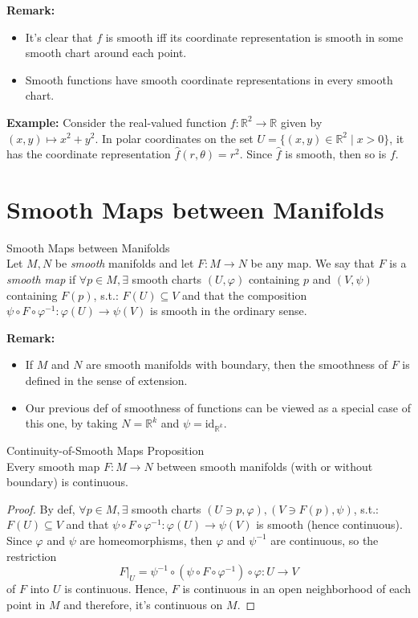 \noindent\textbf{Remark:} \begin{itemize}
    \item It's clear that $f$ is smooth iff its coordinate representation is smooth in some smooth chart around each point.
    \item Smooth functions have smooth coordinate representations in every smooth chart.
\end{itemize}

\noindent\textbf{Example:} Consider the real-valued function $f: \mathbb{R}^2 \to \mathbb{R}$ given by $(x,y) \mapsto x^2+y^2$. In polar coordinates on the set $U= \{(x,y) \in \mathbb{R}^2 \mid x>0 \}$, it has the coordinate representation $\widehat{f} (r,\theta)= r^2$. Since $\widehat{f}$ is smooth, then so is $f$.

\section{Smooth Maps between Manifolds}

\begin{definition}{Smooth Maps between Manifolds}\\
Let $M,N$ be \textit{smooth} manifolds and let $F:M\to N$ be any map. We say that $F$ is a \textit{smooth map} if $\forall p\in M,\exists$ smooth charts $(U,\varphi)$ containing $p$ and $(V,\psi)$ containing $F(p)$, s.t.: $F(U) \subseteq V$ and that the composition $\psi \circ F\circ \varphi^{-1}: \varphi(U) \to \psi(V)$ is smooth in the ordinary sense.
\end{definition}

\noindent\textbf{Remark:} \begin{itemize}
    \item If $M$ and $N$ are smooth manifolds with boundary, then the smoothness of $F$ is defined in the sense of extension.
    \item Our previous def of smoothness of functions can be viewed as a special case of this one, by taking $N= \mathbb{R}^k$ and $\psi= \text{id}_{\mathbb{R}^k}$.
\end{itemize}

\begin{proposition}{Continuity-of-Smooth Maps Proposition}\\
Every smooth map $F:M\to N$ between smooth manifolds (with or without boundary) is continuous.
\end{proposition}

\begin{proof}
    By def, $\forall p\in M,\exists$ smooth charts $(U\ni p,\varphi), (V\ni F(p),\psi)$, s.t.: $F(U)\subseteq V$ and that $\psi\circ F\circ \varphi^{-1}: \varphi(U) \to \psi(V)$ is smooth (hence continuous). Since $\varphi$ and $\psi$ are homeomorphisms, then $\varphi$ and $\psi^{-1}$ are continuous, so the restriction
    \[
    F|_U= \psi^{-1} \circ (\psi \circ F \circ \varphi^{-1}) \circ \varphi:U \to V
    \]
    of $F$ into $U$ is continuous. Hence, $F$ is continuous in an open neighborhood of each point in $M$ and therefore, it's continuous on $M$.
\end{proof}

